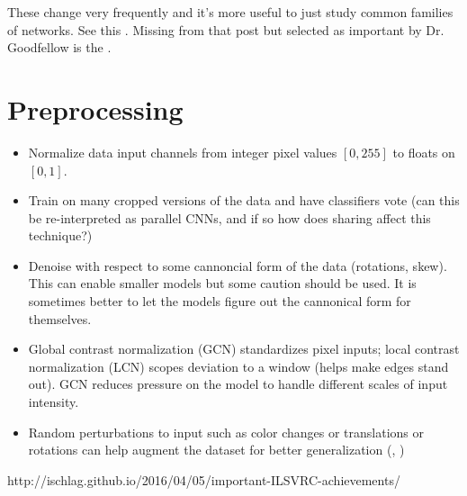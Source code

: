 \documentclass{article}
\begin{document}
These change very frequently and it's more useful to just study common families of networks. See this . Missing from that post but selected as important by Dr. Goodfellow is the .

\section{Preprocessing}

\begin{itemize}
\item Normalize data input channels from integer pixel values $[0,255]$ to floats on $[0,1]$.
\item Train on many cropped versions of the data and have classifiers vote (can this be re-interpreted as parallel CNNs, and if so how does sharing affect this technique?)
\item Denoise with respect to some cannoncial form of the data (rotations, skew). This can enable smaller models but some caution should be used. It is sometimes better to let the models figure out the cannonical form for themselves.
\item Global contrast normalization (GCN) standardizes pixel inputs; local contrast normalization (LCN) scopes deviation to a window (helps make edges stand out). GCN reduces pressure on the model to handle different scales of input intensity.
\item Random perturbations to input such as color changes or translations or rotations can help augment the dataset for better generalization (, )
\end{itemize}

http://ischlag.github.io/2016/04/05/important-ILSVRC-achievements/
\end{document}
